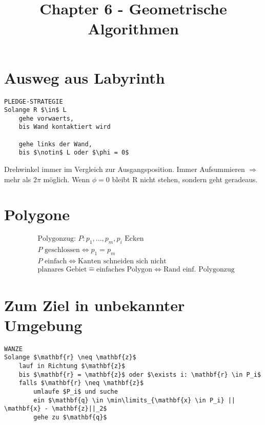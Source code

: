 \documentclass[8pt, DIV15, twocolumn]{scrartcl}
\title{Chapter 6 - Geometrische Algorithmen}
\date{}
\begin{document}
\setlength{\abovedisplayskip}{0pt}
\setlength{\belowdisplayskip}{0pt}
\setlength{\parskip}{0pt}
\setlength{\topmargin}{0pt}

 
\maketitle

\thispagestyle{empty}

\section*{Ausweg aus Labyrinth}

\begin{lstlisting}[mathescape=true]
PLEDGE-STRATEGIE
Solange R $\in$ L
	gehe vorwaerts, 
	bis Wand kontaktiert wird

	gehe links der Wand, 
	bis $\notin$ L oder $\phi = 0$
\end{lstlisting}

Drehwinkel immer im Vergleich zur Ausgangsposition. Immer Aufsummieren $\Rightarrow$ mehr als $2\pi$ möglich. Wenn $\phi = 0$ bleibt R nicht stehen, sondern geht geradeaus.

\section*{Polygone}

\begin{equation*}
\begin{aligned}
&\text{Polygonzug: } P: p_1,...,p_m, p_i \text{ Ecken} \\
&P \text{ geschlossen} \Leftrightarrow p_1 = p_m \\
&P \text{ einfach} \Leftrightarrow \text{Kanten schneiden sich nicht} \\
&\text{planares Gebiet} \hat{=} \text{einfaches Polygon} \Leftrightarrow \text{Rand einf. Polygonzug}
\end{aligned}
\end{equation*}

\section*{Zum Ziel in unbekannter Umgebung}

\begin{lstlisting}[mathescape=true]
WANZE
Solange $\mathbf{r} \neq \mathbf{z}$
	lauf in Richtung $\mathbf{z}$
	bis $\mathbf{r} = \mathbf{z}$ oder $\exists i: \mathbf{r} \in P_i$
	falls $\mathbf{r} \neq \mathbf{z}$
		umlaufe $P_i$ und suche
		ein $\mathbf{q} \in \min\limits_{\mathbf{x} \in P_i} || \mathbf{x} - \mathbf{z}||_2$
		gehe zu $\mathbf{q}$
\end{lstlisting}
\end{document}
